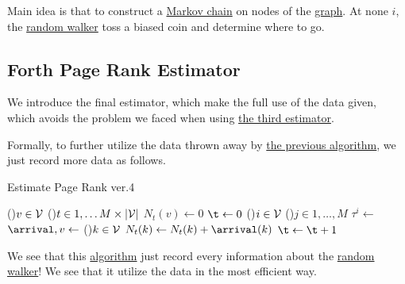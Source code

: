 \begin{prev}
	Main idea is that to construct a \hyperref[def:Markov-chain]{Markov chain} on nodes of the \hyperref[def:graph]{graph}. At none \(i\), the \hyperref[def:random-walker]{random walker} toss a biased coin and determine where to go.
\end{prev}

\subsection{Forth Page Rank Estimator}
We introduce the final estimator, which make the full use of the data given, which avoids the problem we faced when using \hyperref[subsec:third-page-rank-estimator]{the third estimator}.

Formally, to further utilize the data thrown away by \hyperref[algo:Monte-Carlo-algorithm-3]{the previous algorithm}, we just record more data as follows.

\begin{algorithm}[H]\label{algo:Monte-Carlo-algorithm-4}
	\DontPrintSemicolon
	\caption{Estimate Page Rank ver.4}

	\BlankLine

	\For(){\(v\in \mathcal{\MakeUppercase{v}} \)}{
		\For(){\(t\in 1, \ldots M \times \left\vert \mathcal{\MakeUppercase{v}}  \right\vert  \)}{
			\(N_t(v)\gets 0\)\;
		}
	}
	\(\t\gets 0\)\;
	\;
	\For(){\(i\in \mathcal{\MakeUppercase{v}}\)}{
		\For(){\(j\in 1, \ldots, M\)}{
			\(\tau^i \gets \) 
			\(\arrival, v \gets\)
			\For(){\(k\in \mathcal{\MakeUppercase{v}} \)}{
				\(N_t(k)\gets N_t(k) + \arrival(k)\)\;
			}
			\(\t\gets \t + 1\)\;
		}
	}
	\;
\end{algorithm}
\begin{intuition}
	We see that this \hyperref[algo:Monte-Carlo-algorithm-4]{algorithm} just record every information about the \hyperref[def:random-walker]{random walker}! We see that it utilize the data in the most efficient way.
\end{intuition}

